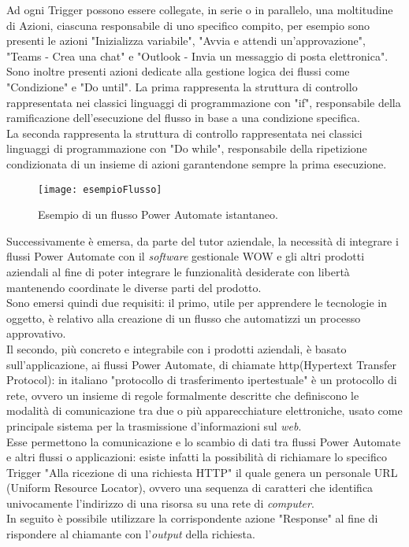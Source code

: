 \noindent Ad ogni Trigger possono essere collegate, in serie o in parallelo, una moltitudine di Azioni, ciascuna responsabile di uno specifico compito, per esempio sono presenti le azioni "Inizializza variabile", "Avvia e attendi un'approvazione", "Teams - Crea una chat" e "Outlook - Invia un messaggio di posta elettronica".\\
Sono inoltre presenti azioni dedicate alla gestione logica dei flussi come "Condizione" e "Do until". La prima rappresenta la struttura di controllo rappresentata nei classici linguaggi di programmazione con "if", responsabile della ramificazione dell'esecuzione del flusso in base a una condizione specifica.\\
La seconda rappresenta la struttura di controllo rappresentata nei classici linguaggi di programmazione con "Do while", responsabile della ripetizione condizionata di un insieme di azioni garantendone sempre la prima esecuzione.
\begin{figure}[htbp] 
    \centering 
    \texttt{[image: esempioFlusso]} 
    \caption{Esempio di un flusso Power Automate istantaneo.}
    \label{fig:esempioFlusso}
\end{figure}
\noindent Successivamente è emersa, da parte del tutor aziendale, la necessità di integrare i flussi Power Automate con il \emph{software} gestionale WOW e gli altri prodotti aziendali al fine di poter integrare le funzionalità desiderate con libertà mantenendo coordinate le diverse parti del prodotto.\\
Sono emersi quindi due requisiti: il primo, utile per apprendere le tecnologie in oggetto, è relativo alla creazione di un flusso che automatizzi un processo approvativo.\\
Il secondo, più concreto e integrabile con i prodotti aziendali, è basato sull'applicazione, ai flussi Power Automate, di chiamate \gls{http}(Hypertext Transfer Protocol): in italiano "protocollo di trasferimento ipertestuale" è un protocollo di rete, ovvero un insieme di regole formalmente descritte che definiscono le modalità di comunicazione tra due o più apparecchiature elettroniche, usato come principale sistema per la trasmissione d'informazioni sul \emph{web}.\\
Esse permettono la comunicazione e lo scambio di dati tra flussi Power Automate e altri flussi o applicazioni: esiste infatti la possibilità di richiamare lo specifico Trigger "Alla ricezione di una richiesta HTTP" il quale genera un personale URL (Uniform Resource Locator), ovvero una sequenza di caratteri che identifica univocamente l'indirizzo di una risorsa su una rete di \emph{computer}.\\
In seguito è possibile utilizzare la corrispondente azione "Response" al fine di rispondere al chiamante con l'\emph{output} della richiesta.
